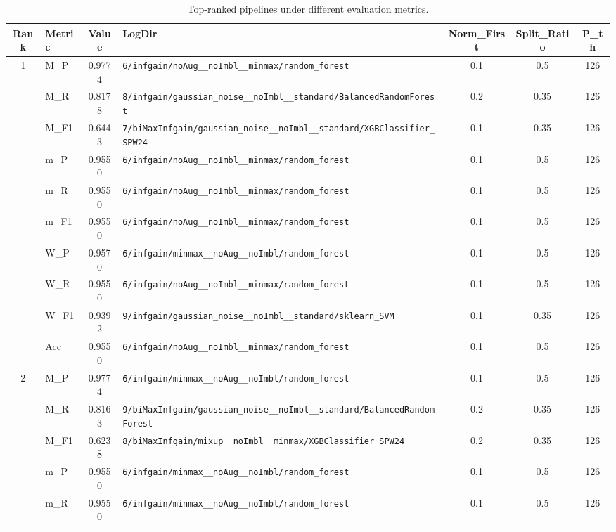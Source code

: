 \begin{table}[htbp]
\caption{Top-ranked pipelines under different evaluation metrics.}
\label{tab:rank_metric_vertical}
\centering
\small
\setlength{\tabcolsep}{4pt}
\begin{tabular}{|c|l|c|>{\ttfamily\footnotesize}p{7.2cm}|c|c|c|}
\hline
Rank & Metric & Value & LogDir & Norm\_First & Split\_Ratio & P\_th \\
\hline
\multirow{10}{*}{1} & M\_P & 0.9774 & \texttt{6/infgain/noAug\_\_noImbl\_\_minmax/random\_forest} & 0.1 & 0.5  & 126 \\ 
 & M\_R & 0.8178 & \texttt{8/infgain/gaussian\_noise\_\_noImbl\_\_standard/BalancedRandomForest} & 0.2 & 0.35  & 126 \\ 
 & M\_F1 & 0.6443 & \texttt{7/biMaxInfgain/gaussian\_noise\_\_noImbl\_\_standard/XGBClassifier\_SPW24} & 0.1 & 0.35  & 126 \\ 
 & m\_P & 0.9550 & \texttt{6/infgain/noAug\_\_noImbl\_\_minmax/random\_forest} & 0.1 & 0.5  & 126 \\ 
 & m\_R & 0.9550 & \texttt{6/infgain/noAug\_\_noImbl\_\_minmax/random\_forest} & 0.1 & 0.5  & 126 \\ 
 & m\_F1 & 0.9550 & \texttt{6/infgain/noAug\_\_noImbl\_\_minmax/random\_forest} & 0.1 & 0.5  & 126 \\ 
 & W\_P & 0.9570 & \texttt{6/infgain/minmax\_\_noAug\_\_noImbl/random\_forest} & 0.1 & 0.5  & 126 \\ 
 & W\_R & 0.9550 & \texttt{6/infgain/noAug\_\_noImbl\_\_minmax/random\_forest} & 0.1 & 0.5  & 126 \\ 
 & W\_F1 & 0.9392 & \texttt{9/infgain/gaussian\_noise\_\_noImbl\_\_standard/sklearn\_SVM} & 0.1 & 0.35  & 126 \\ 
 & Acc & 0.9550 & \texttt{6/infgain/noAug\_\_noImbl\_\_minmax/random\_forest} & 0.1 & 0.5  & 126 \\ 
\hline
\multirow{10}{*}{2} & M\_P & 0.9774 & \texttt{6/infgain/minmax\_\_noAug\_\_noImbl/random\_forest} & 0.1 & 0.5  & 126 \\ 
 & M\_R & 0.8163 & \texttt{9/biMaxInfgain/gaussian\_noise\_\_noImbl\_\_standard/BalancedRandomForest} & 0.2 & 0.35  & 126 \\ 
 & M\_F1 & 0.6238 & \texttt{8/biMaxInfgain/mixup\_\_noImbl\_\_minmax/XGBClassifier\_SPW24} & 0.2 & 0.35  & 126 \\ 
 & m\_P & 0.9550 & \texttt{6/infgain/minmax\_\_noAug\_\_noImbl/random\_forest} & 0.1 & 0.5  & 126 \\ 
 & m\_R & 0.9550 & \texttt{6/infgain/minmax\_\_noAug\_\_noImbl/random\_forest} & 0.1 & 0.5  & 126 \\ 

\end{tabular}
\end{table}
